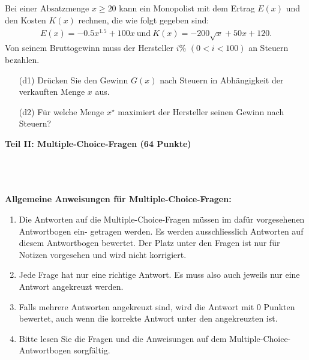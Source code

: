 \subsection*{}
Bei einer Absatzmenge $ x \geq 20  $ kann ein Monopolist mit dem Ertrag $ E(x) $ und den Kosten $ K(x) $ rechnen, die wie folgt gegeben sind:
\begin{align*}
	E(x) = -0.5 x^{1.5} +100 x \ \textrm{und} \ K(x) = -200\sqrt{x} + 50 x +120.
\end{align*}
Von seinem Bruttogewinn muss der Hersteller $ i \% $  $ (0 < i < 100) $ an Steuern bezahlen.
\begin{enumerate}
	\item[(d1)]
	Drücken Sie den Gewinn $ G(x) $ nach Steuern in Abhängigkeit der verkauften Menge $ x $ aus.
	\item[(d2)] 
	Für welche Menge $ x^\star $ maximiert der Hersteller seinen Gewinn nach Steuern?
\end{enumerate}


\newpage


\begin{Large}
\textbf{Teil II: Multiple-Choice-Fragen (64 Punkte)}
\end{Large}
\\
\\
\\
\textbf{Allgemeine Anweisungen für Multiple-Choice-Fragen:}
\\
\renewcommand{\labelenumi}{(\roman{enumi})}
\begin{enumerate}
\item
Die Antworten auf die Multiple-Choice-Fragen müssen im dafür vorgesehenen Antwortbogen ein-
getragen werden. Es werden ausschliesslich Antworten auf diesem Antwortbogen bewertet. Der
Platz unter den Fragen ist nur für Notizen vorgesehen und wird nicht korrigiert.

\item
Jede Frage hat nur eine richtige Antwort. Es muss also auch jeweils nur eine Antwort angekreuzt werden.

\item
Falls mehrere Antworten angekreuzt sind, wird die Antwort mit 0 Punkten bewertet, auch wenn
die korrekte Antwort unter den angekreuzten ist.

\item
Bitte lesen Sie die Fragen und die Anweisungen auf dem Multiple-Choice-Antwortbogen sorgfältig.

\end{enumerate}
\newpage

